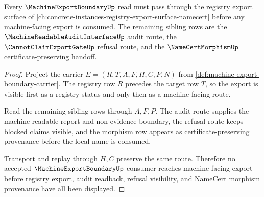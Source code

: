 \begin{theorem}
\label{thm:machine-export-boundary-registry-export-dependency}
Every $\MachineExportBoundaryUp$ read must pass through the registry export surface of \autoref{ch:concrete-instances-registry-export-surface-namecert} before any machine-facing export is consumed. The remaining sibling rows are the $\MachineReadableAuditInterfaceUp$ audit route, the $\CannotClaimExportGateUp$ refusal route, and the $\NameCertMorphismUp$ certificate-preserving handoff.
\end{theorem}
\begin{proof}
Project the carrier $E=(R,T,A,F,H,C,P,N)$ from \autoref{def:machine-export-boundary-carrier}. The registry row $R$ precedes the target row $T$, so the export is visible first as a registry status and only then as a machine-facing route.

Read the remaining sibling rows through $A,F,P$. The audit route supplies the machine-readable report and non-evidence boundary, the refusal route keeps blocked claims visible, and the morphism row appears as certificate-preserving provenance before the local name is consumed.

Transport and replay through $H,C$ preserve the same route. Therefore no accepted $\MachineExportBoundaryUp$ consumer reaches machine-facing export before registry export, audit readback, refusal visibility, and NameCert morphism provenance have all been displayed.
\end{proof}
